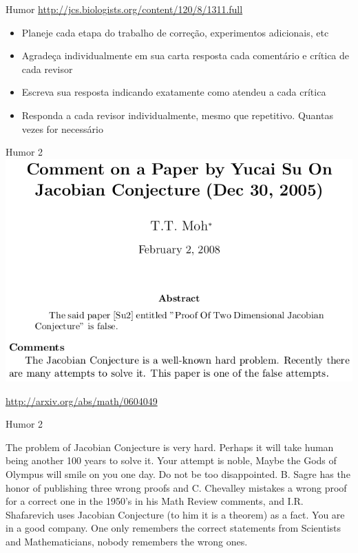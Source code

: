 \documentclass{beamer}
\begin{document}
\begin{frame}{Humor}
  \url{http://jcs.biologists.org/content/120/8/1311.full}

  \begin{itemize}
  \item Planeje cada etapa do trabalho de correção, experimentos
    adicionais, etc
  \item Agradeça individualmente em sua carta resposta cada comentário
    e crítica de cada revisor
  \item Escreva sua resposta indicando exatamente \alert{como} atendeu
    a \alert{cada} crítica
  \item Responda a cada revisor individualmente, mesmo que
    repetitivo. Quantas vezes for necessário
  \end{itemize}
\end{frame}

\begin{frame}{Humor 2}
  \includegraphics[width=\textwidth]{Etapas/olympus-abs}

  \url{http://arxiv.org/abs/math/0604049}
\end{frame}

\begin{frame}{Humor 2}
  \begin{block}{}
    The problem of Jacobian Conjecture is very hard. Perhaps it will
    take human being another 100 years to solve it. \alert{Your
      attempt is noble, Maybe the Gods of Olympus will smile on you
      one day.} Do not be too disappointed. B. Sagre has the honor of
    publishing three wrong proofs and C. Chevalley mistakes a wrong
    proof for a correct one in the 1950’s in his Math Review comments,
    and I.R. Shafarevich uses Jacobian Conjecture (to him it is a
    theorem) as a fact. You are in a good company. One only remembers
    the correct statements from Scientists and Mathematicians, nobody
    remembers the wrong ones.
  \end{block}
\end{frame}
\end{document}
